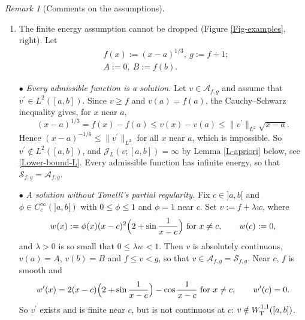 \documentclass[reqno,12pt]{amsart}
\numberwithin{equation}{section}
\def\J{\mathcal{J}_L}
\def\A{\mathcal{A}_{f,g}}
\def\Sol{\mathcal{S}_{f,g}}
\def\Of{{\sf (O$_f$)}}
\def\Og{{\sf (O$_g$)}}
\theoremstyle{remark}
\newtheorem{remark}[theorem]{Remark}
\begin{document}
\begin{remark}[Comments on the assumptions]
\begin{enumerate}[leftmargin=2em, itemsep=1em, topsep=0.6em]
\smallskip
$\scriptstyle\bullet$ {\em It has a corner at the contact point.} At $0$,
\begin{equation*}
D_-f(0)=1>-1=D^+f(0),
\end{equation*}
so that \Of\ fails (``concave corner''), and $u=f$ is not differentiable at $0$.

\smallskip
$\scriptstyle\bullet$ {\em The upper obstacle.} By symmetry, the condition \Og\ cannot be dropped either. Take the same $L$ on $[-1,1]$, with
\begin{align*}
&f\equiv-1,\ g(x)=|x|;\\
&A=B=1.
\end{align*}
The unique solution is $u=g$, and $D_+g(0)=1>-1=D^-g(0)$: \Og\ fails (``convex corner'').


\item[(c)] {\sf The finite energy assumption cannot be dropped} (Figure \ref{Fig-examples}, right). Let
\begin{align*}
&f(x):=(x-a)^{1/3},\ g:=f+1;\\
&A:=0,\ B:=f(b).
\end{align*}

\smallskip
$\scriptstyle\bullet$ {\em Every admissible function is a solution.} Let $v\in\A$ and assume that $v^\prime\in L^2([a,b])$. Since $v\geq f$ and $v(a)=f(a)$, the Cauchy--Schwarz inequality gives, for $x$ near $a$,
\begin{equation*}
(x-a)^{1/3}=f(x)-f(a)\leq v(x)-v(a)\leq\|v^\prime\|_{L^2}\sqrt{x-a}.
\end{equation*}
Hence $(x-a)^{-1/6}\leq\|v^\prime\|_{L^2}$ for all $x$ near $a$, which is impossible. So $v^\prime\notin L^2([a,b])$, and $\J(v;[a,b])=\infty$ by Lemma \ref{L-apriori} below, see \eqref{Lower-bound-L}. Every admissible function has infinite energy, so that $\Sol=\A$.

\smallskip
$\scriptstyle\bullet$ {\em A solution without Tonelli's partial regularity.} Fix $c\in]a,b[$ and $\phi\in C^\infty_c(]a,b[)$ with $0\leq\phi\leq1$ and $\phi=1$ near $c$. Set $v:=f+\lambda w$, where
\begin{equation*}
w(x):=\phi(x)(x-c)^2\Big(2+\sin\frac{1}{x-c}\Big)\hbox{ for }x\neq c,\qquad w(c):=0,
\end{equation*}
and $\lambda>0$ is so small that $0\leq\lambda w<1$. Then $v$ is absolutely continuous, $v(a)=A$, $v(b)=B$ and $f\leq v<g$, so that $v\in\A=\Sol$. Near $c$, $f$ is smooth and
\begin{equation*}
w^\prime(x)=2(x-c)\Big(2+\sin\frac1{x-c}\Big)-\cos\frac1{x-c}\hbox{ for }x\neq c,\qquad w^\prime(c)=0.
\end{equation*}
So $v^\prime$ exists and is finite near $c$, but is not continuous at $c$: $v\notin W^{1,1}_{\rm T}([a,b])$.


\end{enumerate}
\end{remark}
\end{document}
